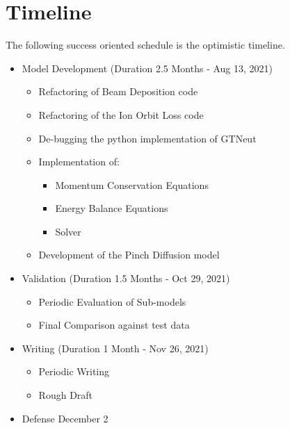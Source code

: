 \section{Timeline}\label{sec:Timeline}

The following success oriented schedule is the optimistic timeline.

\begin{itemize}
	\item Model Development \hfill (Duration 2.5 Months - Aug 13, 2021)
	\begin{itemize}
		\item Refactoring of Beam Deposition code
		\item Refactoring of the Ion Orbit Loss code
		\item De-bugging the python implementation of GTNeut
		\item Implementation of:
		\begin{itemize}
			\item Momentum Conservation Equations
			\item Energy Balance Equations
			\item Solver
		\end{itemize}
		\item Development of the Pinch Diffusion model
	\end{itemize}
	\item Validation \hfill (Duration 1.5 Months - Oct 29, 2021)
		\begin{itemize}
			\item Periodic Evaluation of Sub-models
			\item Final Comparison against test data
		\end{itemize}
	\item Writing \hfill (Duration 1 Month - Nov 26, 2021)
		\begin{itemize}
			\item Periodic Writing
			\item Rough Draft
		\end{itemize}
	\item Defense \hfill December 2
\end{itemize}